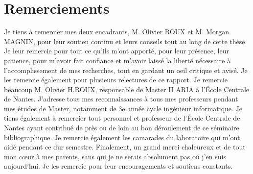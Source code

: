 \documentclass[11pt]{report}
\theoremstyle{definition}
\begin{document}
\chapter*{Remerciements}
Je tiens \`a remercier mes deux encadrants, M. Olivier ROUX et M. Morgan MAGNIN, pour leur soutien continu et leurs conseils tout au long de cette th\`ese.
Je leur remercie pour tout ce qu'ils m'ont apport\'e, pour leur pr\'esence, leur patience,
pour m'avoir fait confiance et m'avoir laiss\'e la libert\'e n\'ecessaire \`a l'accomplissement de mes recherches, tout en gardant un oeil critique et avis\'e.
Je les remercie \'egalement pour plusieurs relectures de ce rapport.
Je remercie beaucoup M. Olivier H.ROUX, responsable de Master II ARIA \`a l'\'Ecole Centrale de Nantes.
J'adresse tous mes reconnaissances \`a tous mes professeurs pendant mes \'etudes de Master, notamment de 3e ann\'ee cycle ing\'enieur informatique.
Je tiens \'egalement \`a remercier tout personnel et professeur de l'\'Ecole Centrale de Nantes ayant contribu\'e de pr\`es ou de loin au bon d\'eroulement de ce s\'eminaire bibliographique.
Je remercie \'egalement les camarades du laboratoire qui m'ont aid\'e pendant ce dur semestre.
Finalement, un grand merci chaleureux et de tout mon c\oe ur \`a mes parents, sans qui je ne serais absolument pas o\`u j'en suis aujourd'hui.
Je les remercie pour leur encouragements et soutiens constants.

\end{document}
